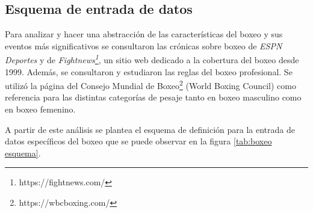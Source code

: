 \subsection{Esquema de entrada de datos}

Para analizar y hacer una abstracción de las características del boxeo y sus eventos más significativos se consultaron las crónicas sobre boxeo de 
\textit{ESPN Deportes} y de \textit{Fightnews\footnote[1]{https://fightnews.com/}}, un sitio web dedicado a la cobertura del boxeo desde 1999. 
Además, se consultaron y estudiaron las reglas del boxeo profesional. Se utilizó la página del Consejo Mundial de 
Boxeo\footnote[2]{https://wbcboxing.com/} (World Boxing Council) como referencia para las distintas categorías de pesaje tanto en boxeo masculino como en 
boxeo femenino.

A partir de este análisis se plantea el esquema de definición para la entrada de datos específicos del boxeo que se puede observar en la figura \ref{tab:boxeo esquema}. 

